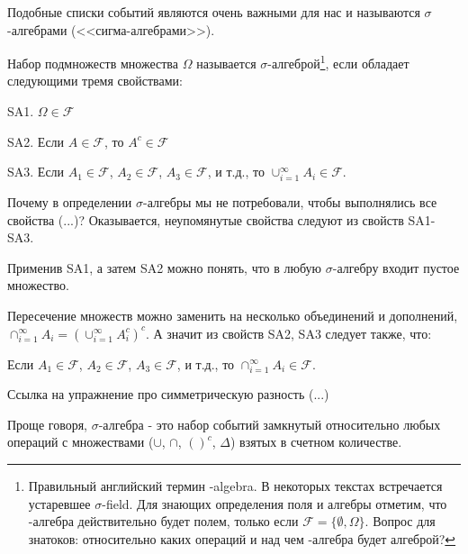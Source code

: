 {Подобные списки событий являются очень важными для нас и называются $\sigma$-алгебрами (<<сигма-алгебрами>>).

\begin{mydef} Набор подмножеств множества $\Omega$ называется $\sigma$-алгеброй\footnote{Правильный английский термин \s-algebra. В некоторых текстах встречается устаревшее $\sigma$-field. Для знающих определения поля и алгебры отметим, что \s-алгебра действительно будет полем, только если $\mathcal{F}=\{\emptyset,\Omega\}$. Вопрос для знатоков: относительно каких операций и над чем \s-алгебра будет алгеброй? }, если обладает следующими тремя свойствами:

SA1. $\Omega \in \mathcal{F}$ 

SA2. Если $A\in \mathcal{F}$, то $A^{c}\in \mathcal{F}$ 

SA3. Если $A_{1}\in\mathcal{F}$, $A_{2}\in\mathcal{F}$, $A_{3}\in\mathcal{F}$, и т.д., то $\cup_{i=1}^{\infty} A_{i} \in\mathcal{F}$.
\end{mydef}


\begin{myex}
\end{myex}

\begin{myex}
\end{myex}

Почему в определении $\sigma$-алгебры мы не потребовали, чтобы выполнялись все свойства (...)? Оказывается, неупомянутые свойства следуют из свойств SA1-SA3.

\begin{myex} Применив SA1, а затем SA2 можно понять, что в любую $\sigma$-алгебру входит пустое множество.
\end{myex}

\begin{myex} Пересечение множеств можно заменить на несколько объединений и дополнений, $\cap_{i=1}^{\infty} A_{i}=\left(\cup_{i=1}^{\infty}A_{i}^{c} \right)^{c}$. А значит из свойств SA2, SA3 следует также, что:

Если $A_{1}\in\mathcal{F}$, $A_{2}\in\mathcal{F}$, $A_{3}\in\mathcal{F}$, и т.д., то $\cap_{i=1}^{\infty} A_{i} \in\mathcal{F}$.
\end{myex}


Ссылка на упражнение про симметрическую разность (...)

Проще говоря, $\sigma$-алгебра - это набор событий замкнутый относительно любых операций с множествами ($\cup$, $\cap$, $()^{c}$, $\Delta$) взятых в счетном количестве.


}
